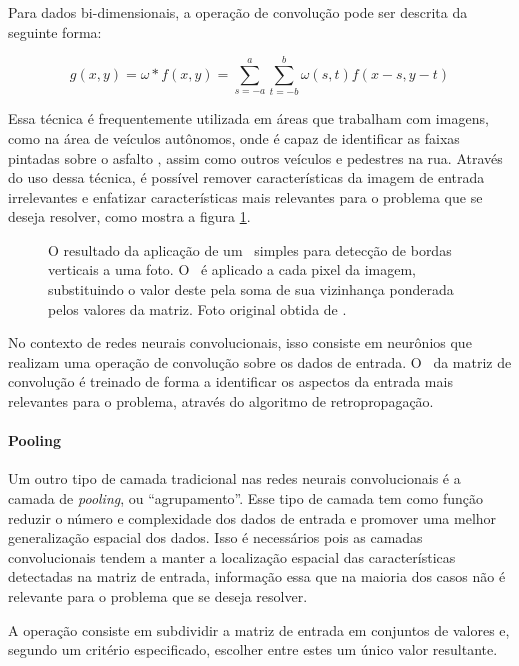 Para dados bi-dimensionais, a operação de convolução pode ser descrita da seguinte forma:

\begin{equation}
    g(x,y) = \omega * f(x,y) = \sum\limits_{s=-a}^a\sum\limits_{t=-b}^b\omega(s,t)f(x-s, y-t)
\end{equation}

Essa técnica é frequentemente utilizada em áreas que trabalham com imagens, como na área de veículos autônomos, onde é capaz de identificar as faixas pintadas sobre o asfalto \cite{peddagollaLaneDetectionAutonomous}, assim como outros veículos e pedestres na rua.
Através do uso dessa técnica, é possível remover características da imagem de entrada irrelevantes e enfatizar características mais relevantes para o problema que se deseja resolver, como mostra a figura \ref{fig:conv}.

\begin{figure}[ht]
    \centering
    
    \caption{O resultado da aplicação de um \ simples para detecção de bordas verticais a uma foto. 
    O \ é aplicado a cada pixel da imagem, substituindo o valor deste pela soma de sua vizinhança ponderada pelos valores da matriz. 
    Foto original obtida de \cite{diliffEnglishLookingEast2015}.}
    \label{fig:conv}
\end{figure}

No contexto de redes neurais convolucionais, isso consiste em neurônios que realizam uma operação de convolução sobre os dados de entrada.
O \ da matriz de convolução é treinado de forma a identificar os aspectos da entrada mais relevantes para o problema, através do algoritmo de retropropagação.

\paragraph{Pooling}
\label{sec:pooling}

Um outro tipo de camada tradicional nas redes neurais convolucionais é a camada de \textit{pooling}, ou ``agrupamento''.
Esse tipo de camada tem como função reduzir o número e complexidade dos dados de entrada e promover uma melhor generalização espacial dos dados.
Isso é necessários pois as camadas convolucionais tendem a manter a localização espacial das características detectadas na matriz de entrada, informação essa que na maioria dos casos não é relevante para o problema que se deseja resolver.

A operação consiste em subdividir a matriz de entrada em conjuntos de valores e, segundo um critério especificado, escolher entre estes um único valor resultante.

